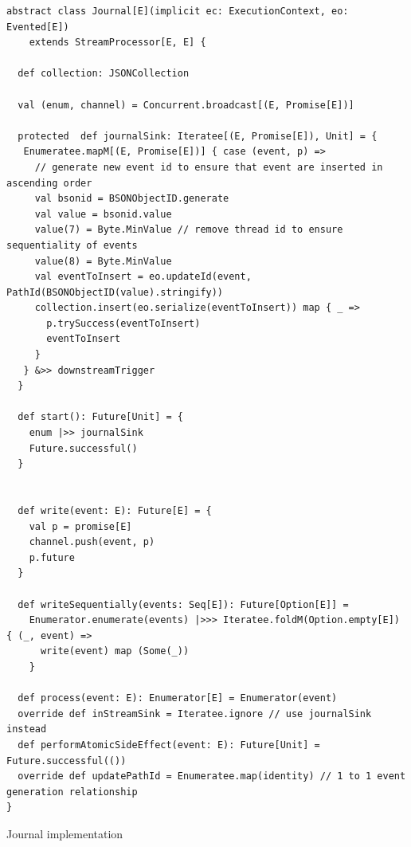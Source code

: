 \begin{listing}[h]
\begin{verbatim}
abstract class Journal[E](implicit ec: ExecutionContext, eo: Evented[E]) 
    extends StreamProcessor[E, E] {

  def collection: JSONCollection

  val (enum, channel) = Concurrent.broadcast[(E, Promise[E])]
  
  protected  def journalSink: Iteratee[(E, Promise[E]), Unit] = {
   Enumeratee.mapM[(E, Promise[E])] { case (event, p) =>
     // generate new event id to ensure that event are inserted in ascending order
     val bsonid = BSONObjectID.generate 
     val value = bsonid.value
     value(7) = Byte.MinValue // remove thread id to ensure sequentiality of events
     value(8) = Byte.MinValue
     val eventToInsert = eo.updateId(event, PathId(BSONObjectID(value).stringify))
     collection.insert(eo.serialize(eventToInsert)) map { _ =>
       p.trySuccess(eventToInsert)
       eventToInsert
     }
   } &>> downstreamTrigger
  }

  def start(): Future[Unit] = {
    enum |>> journalSink
    Future.successful()
  }


  def write(event: E): Future[E] = {
    val p = promise[E]
    channel.push(event, p)
    p.future
  }

  def writeSequentially(events: Seq[E]): Future[Option[E]] =
    Enumerator.enumerate(events) |>>> Iteratee.foldM(Option.empty[E]) { (_, event) =>
      write(event) map (Some(_))
    }

  def process(event: E): Enumerator[E] = Enumerator(event)
  override def inStreamSink = Iteratee.ignore // use journalSink instead
  def performAtomicSideEffect(event: E): Future[Unit] = Future.successful(())
  override def updatePathId = Enumeratee.map(identity) // 1 to 1 event generation relationship
}
\end{verbatim}
\caption{Journal implementation}
\label{lst:journalimpl}
\end{listing}

